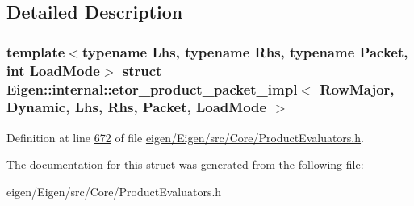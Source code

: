 \subsection{Detailed Description}
\subsubsection*{template$<$typename Lhs, typename Rhs, typename Packet, int Load\+Mode$>$\newline
struct Eigen\+::internal\+::etor\+\_\+product\+\_\+packet\+\_\+impl$<$ Row\+Major, Dynamic, Lhs, Rhs, Packet, Load\+Mode $>$}



Definition at line \hyperlink{eigen_2_eigen_2src_2_core_2_product_evaluators_8h_source_l00672}{672} of file \hyperlink{eigen_2_eigen_2src_2_core_2_product_evaluators_8h_source}{eigen/\+Eigen/src/\+Core/\+Product\+Evaluators.\+h}.



The documentation for this struct was generated from the following file\+:\begin{DoxyCompactItemize}
\item 
eigen/\+Eigen/src/\+Core/\+Product\+Evaluators.\+h\end{DoxyCompactItemize}

